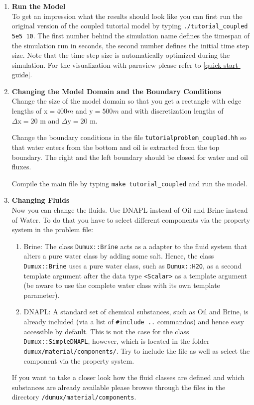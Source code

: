 \begin{enumerate}

\item \textbf{Run the Model} \\
To get an impression what the results should look like you can first run the original version of the coupled tutorial model by typing  \texttt{./tutorial\_coupled 5e5 10}. The first number behind the simulation name defines the timespan of the simulation run in seconds, the second number defines the initial time step size. Note that the time step size is automatically optimized during the simulation. For the visualization with paraview please refer to \ref{quick-start-guide}.\\

\item \textbf{Changing the Model Domain and the Boundary Conditions} \\
  Change the size of the model domain so that you get a rectangle with
  edge lengths of $\text{x} = 400 m$ and $\text{y} = 500 m$ and with
  discretization lengths of $\Delta \text{x} = 20$ m and $\Delta
  \text{y} = 20$ m.
  
  Change the boundary conditions in the file
  \texttt{tutorialproblem\_coupled.hh} so that water enters from the
  bottom and oil is extracted from the top boundary. The right and the
  left boundary should be closed for water and oil fluxes. 

  Compile the main file by typing \texttt{make tutorial\_coupled} and
  run the model.


\item \textbf{Changing Fluids} \\
Now you can change the fluids. Use DNAPL instead of Oil and Brine instead of Water. To do that you have to select different components via the property system in the problem file:
\begin{enumerate}
 \item Brine: The class \texttt{Dumux::Brine} acts as a adapter to the fluid system that alters a pure water class by adding some salt. Hence, the class \texttt{Dumux::Brine} uses a pure water class, such as \texttt{Dumux::H2O}, as a second template argument after the data type \texttt{<Scalar>} as a template argument (be aware to use the complete water class with its own template parameter).
 \item DNAPL: A standard set of chemical substances, such as Oil and Brine, is already included (via a list of \texttt{\#include ..} commandos) and hence easy accessible by default. This is not the case for the class \texttt{Dumux::SimpleDNAPL}, however, which is located in the folder \texttt{dumux/material/components/}. Try to include the file as well as select the component via the property system.
\end{enumerate}
If you want to take a closer look how the fluid classes are defined and which substances are already available please browse through the files in the directory
\texttt{/dumux/material/components}.


\end{enumerate}
